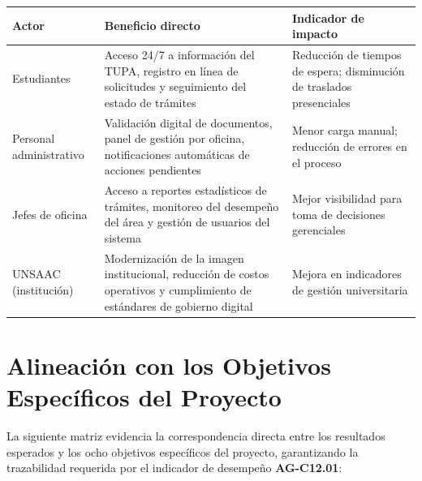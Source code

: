 {\small
\begin{tabular}{|p{2.8cm}|p{5.0cm}|p{4.8cm}|}
\hline
\textbf{Actor} & \textbf{Beneficio directo} & \textbf{Indicador de impacto} \\
\hline
Estudiantes & Acceso 24/7 a información del TUPA, registro en línea de solicitudes y seguimiento del estado de trámites & Reducción de tiempos de espera; disminución de traslados presenciales \\
\hline
Personal administrativo & Validación digital de documentos, panel de gestión por oficina, notificaciones automáticas de acciones pendientes & Menor carga manual; reducción de errores en el proceso \\
\hline
Jefes de oficina & Acceso a reportes estadísticos de trámites, monitoreo del desempeño del área y gestión de usuarios del sistema & Mejor visibilidad para toma de decisiones gerenciales \\
\hline
UNSAAC (institución) & Modernización de la imagen institucional, reducción de costos operativos y cumplimiento de estándares de gobierno digital & Mejora en indicadores de gestión universitaria \\
\hline
\end{tabular}
}

\section{Alineación con los Objetivos Específicos del Proyecto}

La siguiente matriz evidencia la correspondencia directa entre los resultados esperados y los
ocho objetivos específicos del proyecto, garantizando la trazabilidad requerida por el indicador
de desempeño \textbf{AG-C12.01}:

